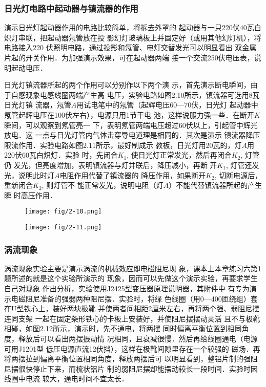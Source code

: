 \subsubsection{日光灯电路中起动器与镇流器的作用}
演示日光灯起动器作用的电路比较简单，将拆去外罩的
起动器与一只220伏40瓦白炽灯串联，把起动器氖管放在投
影幻灯玻璃板上并固定好（或用其他幻灯机），将电路接入220
伏照明电路，通过投影和氖管、电灯交替发光可以明显看出
双金属片起的开关作用．为加强演示效果，可在起动器两端
接一个交流250伏电压表，说明起动电压．

日光灯镇流器所起的两个作用可以分别作以下两个演
示，首先演示断电瞬间，由于自感现象电感线圈两端产生高
电压，实验电路如图2.10所示，镇流器可选用8瓦日光灯镇
流器，氖管$A$用试电笔中的氖管（起辉电压60—70伏，日光灯
起动器中氖管起辉电压在100伏左右），电源只用1节干电
池，这样说服力强一些．在断开$K$瞬间，可以观察到氖管亮一
下，表明氖管两端电压超过60伏以上，引起管中辉光放电．这
一点与日光灯管内气体击穿导电道理是相同的．其次是演示
镇流器降压限流作用．实验电路如图2.11所示，最好制成示
教板，日光灯用20瓦的，灯$A$用220伏60瓦白炽灯．实验
时，先闭合$K_1$, 使日光灯正常发光，然后再闭合$K_2$, 灯管仍
发光，但亮度增加，表明镇流器与灯并联后，降压减小，再断
开$K_1$, 灯管还发光，说明此时灯$A$电阻作用代替了镇流器的
降压作用，如果断开$K_2$, 切断电源后，重新闭合$K_2$, 则灯管不
能正常发光，说明电阻（灯$A$）不能代替镇流器所起的产生瞬
时高压作用．

\begin{figure}[htp]\centering
    \begin{minipage}[t]{0.48\textwidth}
    \centering
\texttt{[image: fig/2-10.png]}
    \caption{}
    \end{minipage}
    \begin{minipage}[t]{0.48\textwidth}
    \centering
\texttt{[image: fig/2-11.png]}
    \caption{}
    \end{minipage}
    \end{figure}

\subsubsection{涡流现象}
涡流现象实验主要是演示涡流的机械效应即电磁阻尼现
象，课本上本章练习六第1题所述的就是这个实验所演示的
现象，因而可以先做这个演示实验，再要求学生自己对现象
作出分析，实验使用J2425型变压器原理说明器，其附件中
有专为演示电磁阻尼准备的强弱两种阻尼摆．实验时，将绿
色线圈（用0—400匝绕组）套在U型铁心上，装好两块极靴
并使两者间相距2厘米左右，再将两个强、弱阻尼摆连同支架
一起在固定条形铁心的卡板上安装好，并使阻尼摆摆动灵活
且不与极靴相碰，如图2.12所示，演示时，先不通电，将两摆
同时偏离平衡位置到相同角度，释放后可以看出两摆振动情
况相同，且衰减很慢．然后再给线圈通电（电源可用J1201型
低压电源直流12伏挡），这样在极靴间隙里存在一个较强的
磁场．再将两摆拉到偏离平衡位置相同角度，释放两摆后可
以明显看到，整铝片制的强阻尼摆很快停止下来，而梳状铝片
制的弱阻尼摆却能摆动较长一段时间．实验时因线圈中电流
较大，通电时间不宜太长．

